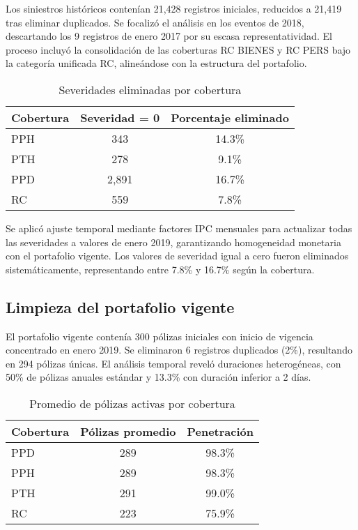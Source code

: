 Los siniestros históricos contenían 21,428 registros iniciales, reducidos a 21,419 tras eliminar duplicados. Se focalizó el análisis en los eventos de 2018, descartando los 9 registros de enero 2017 por su escasa representatividad. El proceso incluyó la consolidación de las coberturas RC BIENES y RC PERS bajo la categoría unificada RC, alineándose con la estructura del portafolio.

\begin{table}[H]
\centering
\caption{Severidades eliminadas por cobertura}
\begin{tabular}{lcc}
\hline
\textbf{Cobertura} & \textbf{Severidad = 0} & \textbf{Porcentaje eliminado} \\
\hline
PPH & 343 & 14.3\% \\
PTH & 278 & 9.1\% \\
PPD & 2,891 & 16.7\% \\
RC & 559 & 7.8\% \\
\hline
\end{tabular}
\end{table}

Se aplicó ajuste temporal mediante factores IPC mensuales para actualizar todas las severidades a valores de enero 2019, garantizando homogeneidad monetaria con el portafolio vigente. Los valores de severidad igual a cero fueron eliminados sistemáticamente, representando entre 7.8\% y 16.7\% según la cobertura.

\subsection{Limpieza del portafolio vigente}

El portafolio vigente contenía 300 pólizas iniciales con inicio de vigencia concentrado en enero 2019. Se eliminaron 6 registros duplicados (2\%), resultando en 294 pólizas únicas. El análisis temporal reveló duraciones heterogéneas, con 50\% de pólizas anuales estándar y 13.3\% con duración inferior a 2 días.

\begin{table}[H]
\centering
\caption{Promedio de pólizas activas por cobertura}
\begin{tabular}{lcc}
\hline
\textbf{Cobertura} & \textbf{Pólizas promedio} & \textbf{Penetración} \\
\hline
PPD & 289 & 98.3\% \\
PPH & 289 & 98.3\% \\
PTH & 291 & 99.0\% \\
RC & 223 & 75.9\% \\
\hline
\end{tabular}
\end{table}

